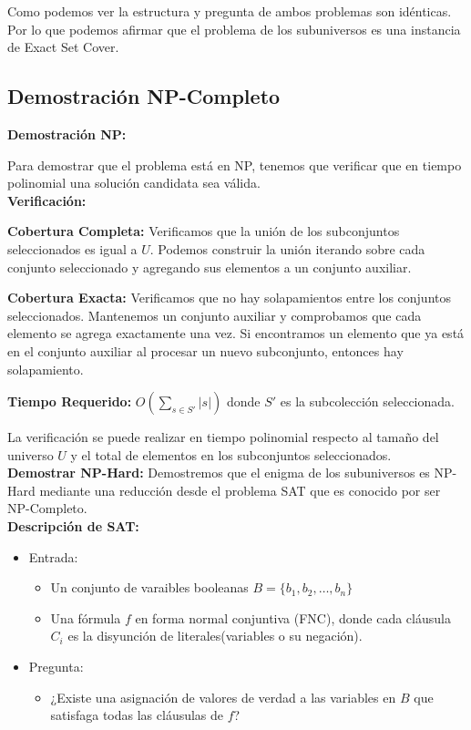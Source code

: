 \documentclass{article}
\begin{document}
Como podemos ver la estructura y pregunta de ambos problemas son idénticas.
Por lo que podemos afirmar que el problema de los subuniversos es una instancia de Exact Set Cover.


\subsection{Demostración NP-Completo}

\textbf{Demostración NP:}

Para demostrar que el problema está en NP, tenemos que verificar que en tiempo polinomial una solución candidata sea válida. \\

\textbf{Verificación:}

\textbf{Cobertura Completa:} Verificamos que la unión de los subconjuntos seleccionados es igual a \(U\). Podemos construir la unión iterando sobre cada conjunto seleccionado y agregando sus elementos a un conjunto auxiliar.

\textbf{Cobertura Exacta:} Verificamos que no hay solapamientos entre los conjuntos seleccionados. Mantenemos un conjunto auxiliar y comprobamos que cada elemento se agrega exactamente una vez. Si encontramos un elemento que ya está en el conjunto auxiliar al procesar un nuevo subconjunto, entonces hay solapamiento.

\textbf{Tiempo Requerido:} $O(\sum_{s\in S'} |s|)$ donde \(S'\) es la subcolección seleccionada.

La verificación se puede realizar en tiempo polinomial respecto al tamaño del universo \(U\) y el total de elementos en los subconjuntos seleccionados.
\\

\textbf{Demostrar NP-Hard:}
 Demostremos que el enigma de los subuniversos es NP-Hard mediante una reducción desde el problema SAT que es conocido por ser NP-Completo.
 \\

\textbf{Descripción de SAT:}
\begin{itemize}
\item Entrada:
    \begin{itemize}
    \item Un conjunto de varaibles booleanas \(B = \)$\{b_1,b_2, \dots, b_n\}$
    \item Una fórmula \(f\) en forma normal conjuntiva (FNC), donde cada cláusula $C_i$ es la disyunción de literales(variables o su negación).
    \end{itemize}
\item Pregunta:
    \begin{itemize}
    \item ¿Existe una asignación de valores de verdad a las variables en \(B\) que satisfaga todas las cláusulas de \(f\)?
    \end{itemize}
\end{itemize}
\end{document}
